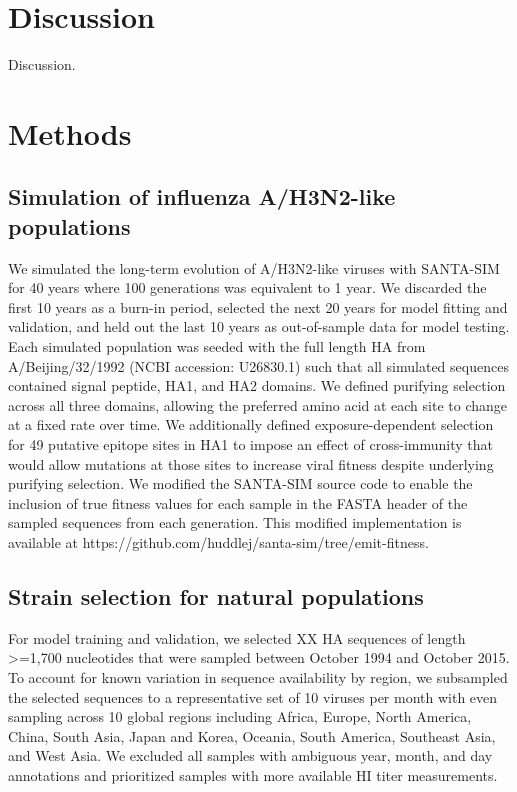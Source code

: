 \section*{Discussion}

Discussion.

\section*{Methods}

\subsection*{Simulation of influenza A/H3N2-like populations}

We simulated the long-term evolution of A/H3N2-like viruses with SANTA-SIM \cite{Jariani2019} for 40 years where 100 generations was equivalent to 1 year.
We discarded the first 10 years as a burn-in period, selected the next 20 years for model fitting and validation, and held out the last 10 years as out-of-sample data for model testing.
Each simulated population was seeded with the full length HA from A/Beijing/32/1992 (NCBI accession: U26830.1) such that all simulated sequences contained signal peptide, HA1, and HA2 domains.
We defined purifying selection across all three domains, allowing the preferred amino acid at each site to change at a fixed rate over time.
We additionally defined exposure-dependent selection for 49 putative epitope sites in HA1 \cite{Luksza:2014hj} to impose an effect of cross-immunity that would allow mutations at those sites to increase viral fitness despite underlying purifying selection.
We modified the SANTA-SIM source code to enable the inclusion of true fitness values for each sample in the FASTA header of the sampled sequences from each generation.
This modified implementation is available at https://github.com/huddlej/santa-sim/tree/emit-fitness.

\subsection*{Strain selection for natural populations}

For model training and validation, we selected XX HA sequences of length >=1,700 nucleotides that were sampled between October 1994 and October 2015.
To account for known variation in sequence availability by region, we subsampled the selected sequences to a representative set of 10 viruses per month with even sampling across 10 global regions including Africa, Europe, North America, China, South Asia, Japan and Korea, Oceania, South America, Southeast Asia, and West Asia.
We excluded all samples with ambiguous year, month, and day annotations and prioritized samples with more available HI titer measurements.

